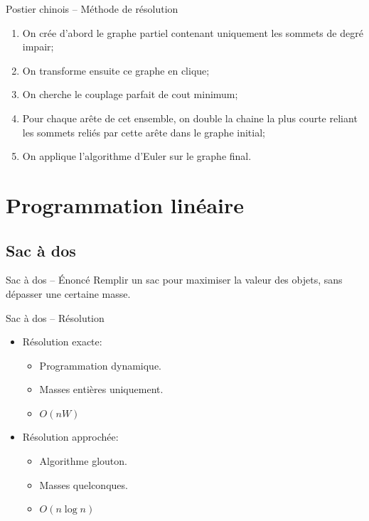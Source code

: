 \documentclass{beamer}
\begin{document}
\begin{frame}{Postier chinois -- Méthode de résolution}
  \begin{enumerate}
    \item On crée d'abord le graphe partiel contenant uniquement les sommets
      de degré impair;
    \item On transforme ensuite ce graphe en clique;
    \item On cherche le couplage parfait de cout minimum;
    \item Pour chaque arête de cet ensemble, on double la chaine la plus
      courte reliant les sommets reliés par cette arête dans le graphe initial;
    \item On applique l'algorithme d'Euler sur le graphe final.
  \end{enumerate}
\end{frame}

\section{Programmation linéaire}
\subsection{Sac à dos}
  \begin{frame}{Sac à dos -- Énoncé}
    Remplir un sac pour maximiser la valeur des objets, sans dépasser une
    certaine masse.
  \end{frame}

  \begin{frame}{Sac à dos -- Résolution}
    \begin{itemize}
      \item Résolution exacte:
      \begin{itemize}
        \item Programmation dynamique.
        \item Masses entières uniquement.
        \item $O(nW)$
      \end{itemize}

      \item Résolution approchée:
      \begin{itemize}
        \item Algorithme glouton.
        \item Masses quelconques.
        \item $O(n \log n)$
      \end{itemize}
    \end{itemize}
  \end{frame}
\end{document}
